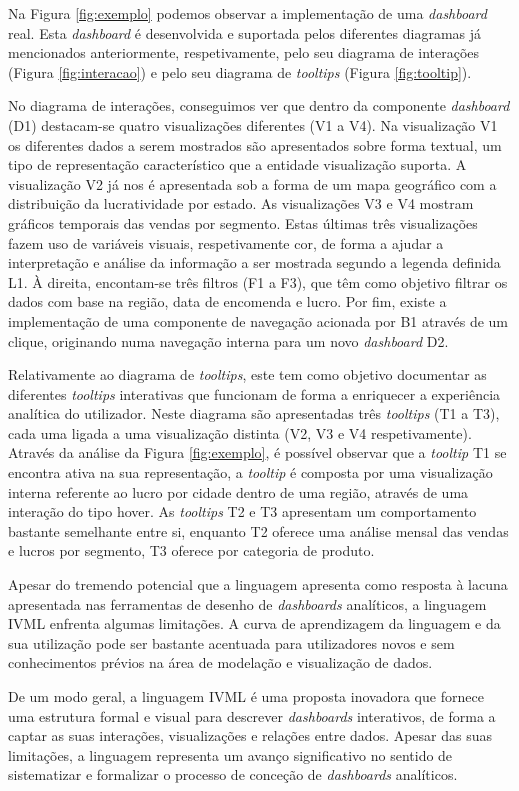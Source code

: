 Na Figura \ref{fig:exemplo} podemos observar a implementação de uma \textit{dashboard} real. Esta \textit{dashboard} é desenvolvida e suportada pelos diferentes diagramas já mencionados anteriormente, respetivamente, pelo seu diagrama de interações (Figura \ref{fig:interacao}) e pelo seu diagrama de \textit{tooltips} (Figura \ref{fig:tooltip}). 

No diagrama de interações, conseguimos ver que dentro da componente \textit{dashboard} (D1) destacam-se quatro visualizações diferentes (V1 a V4). Na visualização V1 os diferentes dados a serem mostrados são apresentados sobre forma textual, um tipo de representação característico que a entidade visualização suporta. A visualização V2 já nos é apresentada sob a forma de um mapa geográfico com a distribuição da lucratividade por estado. As visualizações V3 e V4 mostram gráficos temporais das vendas por segmento. Estas últimas três visualizações fazem uso de variáveis visuais, respetivamente cor, de forma a ajudar a interpretação e análise da informação a ser mostrada segundo a legenda definida L1. À direita, encontam-se três filtros (F1 a F3), que têm como objetivo filtrar os dados com base na região, data de encomenda e lucro. Por fim, existe a implementação de uma componente de navegação acionada por B1 através de um clique, originando numa navegação interna para um novo \textit{dashboard} D2. 

Relativamente ao diagrama de \textit{tooltips}, este tem como objetivo documentar as diferentes \textit{tooltips} interativas que funcionam de forma a enriquecer a experiência analítica do utilizador. Neste diagrama são apresentadas três \textit{tooltips} (T1 a T3), cada uma ligada a uma visualização distinta (V2, V3 e V4 respetivamente). Através da análise da Figura \ref{fig:exemplo}, é possível observar que a \textit{tooltip} T1 se encontra ativa na sua representação, a \textit{tooltip} é composta por uma visualização interna referente ao lucro por cidade dentro de uma região, através de uma interação do tipo hover. As \textit{tooltips} T2 e T3 apresentam um comportamento bastante semelhante entre si, enquanto T2 oferece uma análise mensal das vendas e lucros por segmento, T3 oferece por categoria de produto. 

Apesar do tremendo potencial que a linguagem apresenta como resposta à lacuna apresentada nas ferramentas de desenho de \textit{dashboards} analíticos, a linguagem \gls{IVML} enfrenta algumas limitações. A curva de aprendizagem da linguagem e da sua utilização pode ser bastante acentuada para utilizadores novos e sem conhecimentos prévios na área de modelação e visualização de dados. 

De um modo geral, a linguagem \gls{IVML} é uma proposta inovadora que fornece uma estrutura formal e visual para descrever \textit{dashboards} interativos, de forma a captar as suas interações, visualizações e relações entre dados. Apesar das suas limitações, a linguagem representa um avanço significativo no sentido de sistematizar e formalizar o processo de conceção de \textit{dashboards} analíticos.